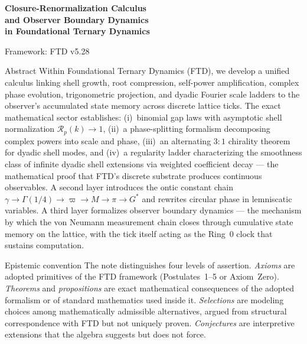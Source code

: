 \documentclass[11pt]{article}
\theoremstyle{tight}
\theoremstyle{plainroman}
\begin{document}
\begin{titlepage}
\centering
\vspace*{2.0cm}
{\fontsize{22}{26}\selectfont\bfseries\color{accent} Closure-Renormalization Calculus\\[0.35em] and Observer Boundary Dynamics\\[0.35em] in Foundational Ternary Dynamics\par}
\vspace{0.8cm}
{\large Framework: FTD v5.28\par}
\vspace{1.5cm}
\begin{minipage}{0.84\textwidth}
\begin{statusbox}{Abstract}
Within Foundational Ternary Dynamics (FTD), we develop a unified calculus linking shell growth, root compression, self-power amplification, complex phase evolution, trigonometric projection, and dyadic Fourier scale ladders to the observer's accumulated state memory across discrete lattice ticks.
The exact mathematical sector establishes: (i)~binomial gap laws with asymptotic shell normalization $\mathcal{R}_p(k)\to 1$, (ii)~a phase-splitting formalism decomposing complex powers into scale and phase, (iii)~an alternating $3{:}1$ chirality theorem for dyadic shell modes, and (iv)~a regularity ladder characterizing the smoothness class of infinite dyadic shell extensions via weighted coefficient decay --- the mathematical proof that FTD's discrete substrate produces continuous observables.
A second layer introduces the ontic constant chain $\gamma \to \Gamma(1/4) \to \varpi \to M \to \pi \to G^*$ and rewrites circular phase in lemniscatic variables.
A third layer formalizes observer boundary dynamics --- the mechanism by which the von Neumann measurement chain closes through cumulative state memory on the lattice, with the tick itself acting as the Ring~0 clock that sustains computation.
\end{statusbox}
\end{minipage}
\vfill
\end{titlepage}
\tableofcontents
\thispagestyle{empty}
\clearpage
\begin{statusbox}{Epistemic convention}
The note distinguishes four levels of assertion. \emph{Axioms} are adopted primitives of the FTD framework (Postulates~1--5 or Axiom~Zero).
\emph{Theorems} and \emph{propositions} are exact mathematical consequences of the adopted formalism or of standard mathematics used inside it.
\emph{Selections} are modeling choices among mathematically admissible alternatives, argued from structural correspondence with FTD but not uniquely proven. \emph{Conjectures} are interpretive extensions that the algebra suggests but does not force.
\end{statusbox}
\end{document}
